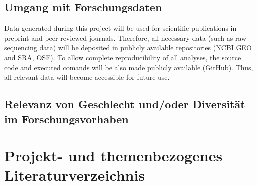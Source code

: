 \documentclass[ngerman]{scrartcl}
\begin{document}
\subsection{Umgang mit Forschungsdaten}
Data generated during this project will be used for scientific publications in
preprint and peer-reviewed journals. Therefore, all necessary data (such as raw
sequencing data) will be deposited in publicly available repositories
(\href{https://www.ncbi.nlm.nih.gov/geo/}{NCBI GEO} and
\href{https://www.ncbi.nlm.nih.gov/sra}{SRA}, \href{https://osf.io/}{OSF}). To
allow complete reproducibility of all analyses, the source code and executed
comands will be also made publicly available
(\href{https://github.com/}{GitHub}).  Thus, all relevant data will become
accessible for future use. 

\subsection{Relevanz von Geschlecht und/oder Diversität im Forschungsvorhaben}

\section{Projekt- und themenbezogenes Literaturverzeichnis}
\label{sec:bib}
\printbibliography[notcategory=reviewed, notcategory=nonreviewed, notcategory=patents_pending, notcategory=patents, heading=none, env=bibliographyNUM]


\backmatter
\end{document}

